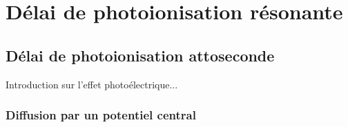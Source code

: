 \part{Délai de photoionisation résonante}
\chapter{Délai de photoionisation attoseconde}
Introduction sur l'effet photoélectrique...

\section{Diffusion par un potentiel central}
\label{sec:DiffusionPotentielCentral}
